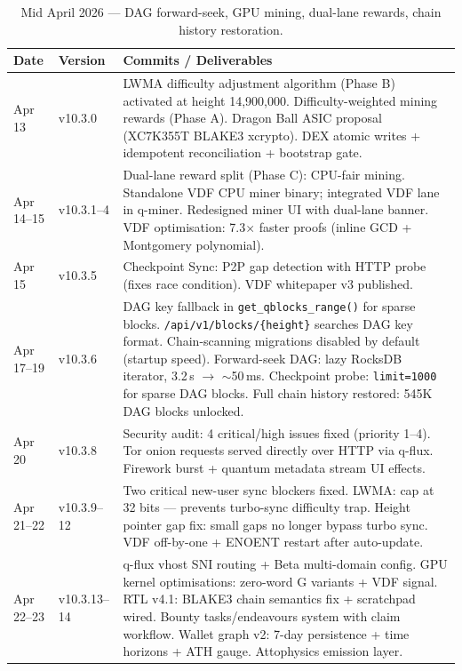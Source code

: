 \documentclass[12pt,a4paper]{article}
\begin{document}
\begin{table}[H]
\centering
\small
\renewcommand{\arraystretch}{1.28}
\begin{tabularx}{\linewidth}{@{}l l X@{}}
\toprule
\textbf{Date} & \textbf{Version} & \textbf{Commits / Deliverables} \\
\midrule
Apr 13 & v10.3.0 &
  LWMA difficulty adjustment algorithm (Phase B) activated at height 14,900,000.
  Difficulty-weighted mining rewards (Phase A).
  Dragon Ball ASIC proposal (XC7K355T BLAKE3 xcrypto).
  DEX atomic writes + idempotent reconciliation + bootstrap gate. \\
\rowcolor{qblue!10}
Apr 14--15 & v10.3.1--4 &
  Dual-lane reward split (Phase C): CPU-fair mining.
  Standalone VDF CPU miner binary; integrated VDF lane in q-miner.
  Redesigned miner UI with dual-lane banner.
  VDF optimisation: 7.3$\times$ faster proofs (inline GCD + Montgomery polynomial). \\
Apr 15 & v10.3.5 &
  Checkpoint Sync: P2P gap detection with HTTP probe (fixes race condition).
  VDF whitepaper v3 published. \\
\rowcolor{qblue!10}
Apr 17--19 & v10.3.6 &
  DAG key fallback in \texttt{get\_qblocks\_range()} for sparse blocks.
  \texttt{/api/v1/blocks/\{height\}} searches DAG key format.
  Chain-scanning migrations disabled by default (startup speed).
  Forward-seek DAG: lazy RocksDB iterator, 3.2\,s $\to$ $\sim$50\,ms.
  Checkpoint probe: \texttt{limit=1000} for sparse DAG blocks.
  Full chain history restored: 545K DAG blocks unlocked. \\
Apr 20 & v10.3.8 &
  Security audit: 4 critical/high issues fixed (priority 1--4).
  Tor onion requests served directly over HTTP via q-flux.
  Firework burst + quantum metadata stream UI effects. \\
\rowcolor{qblue!10}
Apr 21--22 & v10.3.9--12 &
  Two critical new-user sync blockers fixed.
  LWMA: cap at 32 bits — prevents turbo-sync difficulty trap.
  Height pointer gap fix: small gaps no longer bypass turbo sync.
  VDF off-by-one + ENOENT restart after auto-update. \\
Apr 22--23 & v10.3.13--14 &
  q-flux vhost SNI routing + Beta multi-domain config.
  GPU kernel optimisations: zero-word G variants + VDF signal.
  RTL v4.1: BLAKE3 chain semantics fix + scratchpad wired.
  Bounty tasks/endeavours system with claim workflow.
  Wallet graph v2: 7-day persistence + time horizons + ATH gauge.
  Attophysics emission layer. \\
\bottomrule
\end{tabularx}
\caption{Mid April 2026 — DAG forward-seek, GPU mining, dual-lane rewards, chain history restoration.}
\end{table}
\end{document}
